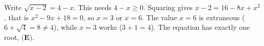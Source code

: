 Write $\sqrt{x-2}=4-x$. This needs $4-x\ge0$. Squaring gives $x-2=16-8x+x^2$, that is $x^2-9x+18=0$, so $x=3$ or $x=6$. The value $x=6$ is extraneous ($6+\sqrt4=8\ne4$), while $x=3$ works ($3+1=4$). The equation has exactly one root, $\boxed{\textbf{(E)}}$.
